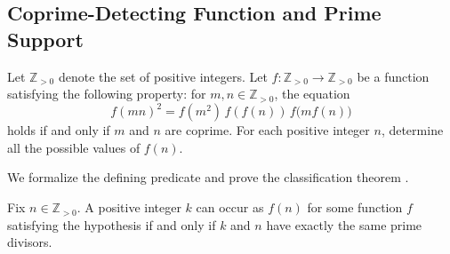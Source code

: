 
\subsection{Coprime-Detecting Function and Prime Support}

\begin{problemstatement}
Let \(\mathbb{Z}_{>0}\) denote the set of positive integers. Let
\(f:\mathbb{Z}_{>0}\to\mathbb{Z}_{>0}\) be a function satisfying the following
property: for \(m,n\in\mathbb{Z}_{>0}\), the equation
\[
  f(mn)^2 = f(m^2)\,f(f(n))\,f\bigl(mf(n)\bigr)
\]
holds if and only if \(m\) and \(n\) are coprime. For each positive integer
\(n\), determine all the possible values of \(f(n)\).
\end{problemstatement}

We formalize the defining predicate
 and prove the
classification theorem
.

\begin{theorem}
Fix \(n\in \mathbb{Z}_{>0}\). A positive integer \(k\) can occur as \(f(n)\) for
some function \(f\) satisfying the hypothesis if and only if \(k\) and \(n\)
have exactly the same prime divisors.
\end{theorem}

